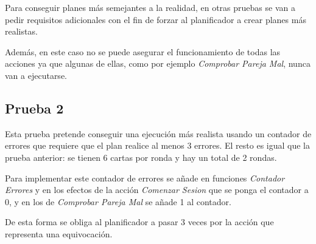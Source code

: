 \documentclass{uc3mpracticas}
\begin{document}
  \vspace{2mm}

  Para conseguir planes más semejantes a la realidad, en otras pruebas se van a pedir requisitos adicionales con el fin de forzar al planificador a crear planes más realistas.

  \vspace{2mm}

  Además, en este caso no se puede asegurar el funcionamiento de todas las acciones ya que algunas de ellas, como por ejemplo \textit{Comprobar Pareja Mal}, nunca van a ejecutarse.


  \newpage

  \subsection{Prueba 2}

  Esta prueba pretende conseguir una ejecución más realista usando un contador de errores que requiere que el plan realice al menos 3 errores. El resto es igual que la prueba anterior: se tienen 6 cartas por ronda y hay un total de 2 rondas.

  \vspace{2mm}

  Para implementar este contador de errores se añade en funciones \textit{Contador Errores} y en los efectos de la acción \textit{Comenzar Sesion} que se ponga el contador a 0, y en los de \textit{Comprobar Pareja Mal} se añade 1 al contador.

  \vspace{2mm}

  De esta forma se obliga al planificador a pasar 3 veces por la acción que representa una equivocación.
\end{document}
